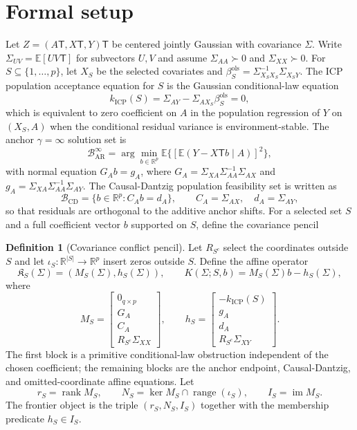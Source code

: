 \documentclass[11pt]{article}
\newcommand{\E}{\mathbb{E}}
\newcommand{\transpose}{\mathsf{T}}
\newcommand{\R}{\mathbb{R}}
\theoremstyle{definition}
\newtheorem{definition}{Definition}
\theoremstyle{plain}
\theoremstyle{remark}
\begin{document}
\section{Formal setup}\label{sec:setup}
Let $Z=(A\transpose,X\transpose,Y)\transpose$ be centered jointly Gaussian with covariance $\Sigma$. Write $\Sigma_{UV}=\E[UV\transpose]$ for subvectors $U,V$ and assume $\Sigma_{AA}\succ0$ and $\Sigma_{XX}\succ0$. For $S\subseteq\{1,\ldots,p\}$, let $X_S$ be the selected covariates and $\beta_S^{\mathrm{ols}}=\Sigma_{X_SX_S}^{-1}\Sigma_{X_SY}$. The ICP population acceptance equation for $S$ is the Gaussian conditional-law equation
\[
  k_{\mathrm{ICP}}(S)=\Sigma_{AY}-\Sigma_{AX_S}\beta_S^{\mathrm{ols}}=0,
\]
which is equivalent to zero coefficient on $A$ in the population regression of $Y$ on $(X_S,A)$ when the conditional residual variance is environment-stable. The anchor $\gamma=\infty$ solution set is
\[
  \mathcal B_{\mathrm{AR}}^\infty=\arg\min_{b\in\R^p}\E\{[\E(Y-X\transpose b\mid A)]^2\},
\]
with normal equation $G_A b=g_A$, where $G_A=\Sigma_{XA}\Sigma_{AA}^{-1}\Sigma_{AX}$ and $g_A=\Sigma_{XA}\Sigma_{AA}^{-1}\Sigma_{AY}$. The Causal-Dantzig population feasibility set is written as
\[
  \mathcal B_{\mathrm{CD}}=\{b\in\R^p: C_A b=d_A\},\qquad C_A=\Sigma_{AX},\quad d_A=\Sigma_{AY},
\]
so that residuals are orthogonal to the additive anchor shifts. For a selected set $S$ and a full coefficient vector $b$ supported on $S$, define the covariance pencil
\begin{definition}[Covariance conflict pencil]\label{def:pencil}
Let $R_{S^c}$ select the coordinates outside $S$ and let $\iota_S:\R^{|S|}\to\R^p$ insert zeros outside $S$. Define the affine operator
\[
  \mathfrak K_S(\Sigma)=(M_S(\Sigma),h_S(\Sigma)),\qquad
  K(\Sigma;S,b)=M_S(\Sigma)b-h_S(\Sigma),
\]
where
\[
M_S=
\begin{bmatrix}
0_{q\times p}\\
G_A\\
C_A\\
R_{S^c}\Sigma_{XX}
\end{bmatrix},\qquad
h_S=
\begin{bmatrix}
-k_{\mathrm{ICP}}(S)\\
g_A\\
d_A\\
R_{S^c}\Sigma_{XY}
\end{bmatrix}.
\]
The first block is a primitive conditional-law obstruction independent of the chosen coefficient; the remaining blocks are the anchor endpoint, Causal-Dantzig, and omitted-coordinate affine equations. Let
\[
  r_S=\operatorname{rank}M_S,\qquad
  N_S=\ker M_S\cap\operatorname{range}(\iota_S),\qquad
  I_S=\operatorname{im}M_S .
\]
The frontier object is the triple $(r_S,N_S,I_S)$ together with the membership predicate $h_S\in I_S$.
\end{definition}
\end{document}
